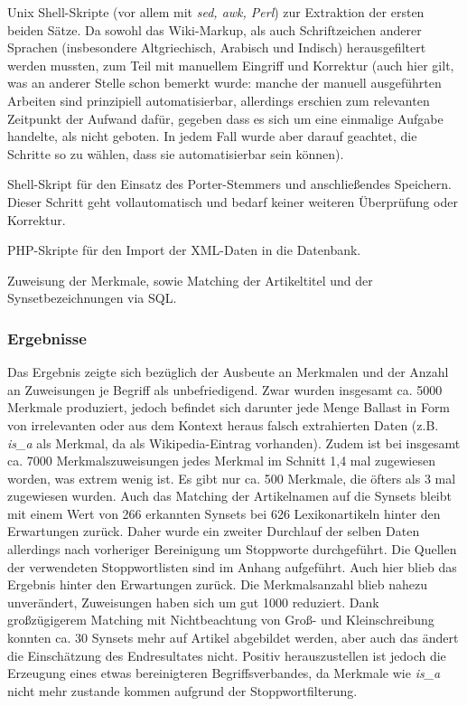 \documentclass[pagesize,DIV=calc,12pt,draft]{scrreprt}
\begin{document}
\begin{inparaenum}
\item   Unix Shell-Skripte (vor allem mit \emph{sed, awk, Perl})   zur Extraktion der ersten beiden Sätze. 
Da sowohl das Wiki-Markup, als   auch Schriftzeichen anderer Sprachen (insbesondere Altgriechisch,   Arabisch und Indisch) herausgefiltert werden mussten, zum Teil mit   manuellem Eingriff und Korrektur (auch hier gilt, was an anderer   Stelle schon bemerkt wurde: manche der manuell ausgeführten Arbeiten   sind prinzipiell automatisierbar, allerdings erschien zum relevanten   Zeitpunkt der Aufwand dafür, gegeben dass es sich um eine einmalige   Aufgabe handelte, als nicht geboten. 
In jedem Fall wurde aber darauf   geachtet, die Schritte so zu wählen, dass sie automatisierbar sein   können). 

\item   Shell-Skript für den Einsatz des Porter-Stemmers und anschließendes   Speichern. 
Dieser Schritt geht vollautomatisch und bedarf keiner   weiteren Überprüfung oder Korrektur. 
\item PHP-Skripte für den Import der XML-Daten in die Datenbank.

\item   Zuweisung der Merkmale, sowie Matching der Artikeltitel und der   Synsetbezeichnungen via SQL. 
\end{inparaenum}

\subsubsection{Ergebnisse}

Das Ergebnis zeigte sich bezüglich der Ausbeute an Merkmalen und der Anzahl an Zuweisungen je Begriff als unbefriedigend. 
Zwar wurden insgesamt ca. 5000 Merkmale produziert, jedoch befindet sich darunter jede Menge Ballast in Form von irrelevanten oder aus dem Kontext heraus falsch extrahierten Daten (z.B. \emph{is\_a} als Merkmal, da als Wikipedia-Eintrag vorhanden). 
Zudem ist bei insgesamt ca. 7000 Merkmalszuweisungen jedes Merkmal im Schnitt 1,4 mal zugewiesen worden, was extrem wenig ist. 
Es gibt nur ca. 500 Merkmale, die öfters als 3 mal zugewiesen wurden. 
Auch das Matching der Artikelnamen auf die Synsets bleibt mit einem Wert von 266 erkannten Synsets bei 626 Lexikonartikeln hinter den Erwartungen zurück. 
Daher wurde ein zweiter Durchlauf der selben Daten allerdings nach vorheriger Bereinigung um Stoppworte durchgeführt. 
Die Quellen der verwendeten Stoppwortlisten sind im Anhang aufgeführt. 
Auch hier blieb das Ergebnis hinter den Erwartungen zurück. 
Die Merkmalsanzahl blieb nahezu unverändert, Zuweisungen haben sich um gut 1000 reduziert. 
Dank großzügigerem Matching mit Nichtbeachtung von Groß- und Kleinschreibung konnten ca. 30 Synsets mehr auf Artikel abgebildet werden, aber auch das ändert die Einschätzung des Endresultates nicht. 
Positiv herauszustellen ist jedoch die Erzeugung eines etwas bereinigteren Begriffsverbandes, da Merkmale wie \emph{is\_a} nicht mehr zustande kommen aufgrund der Stoppwortfilterung. 
\end{document}
